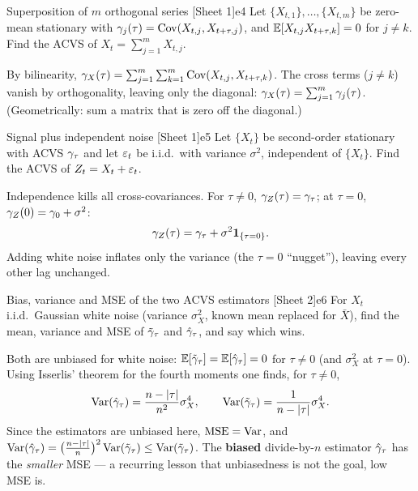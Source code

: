 \begin{exercise}{Superposition of $m$ orthogonal series \quad\textnormal{[Sheet 1]}}{e4}
Let $\{X_{t,1}\},\dots,\{X_{t,m}\}$ be zero-mean stationary with
$\gamma_j(\tau)=\operatorname{Cov}(X_{t,j},X_{t+\tau,j})$, and $\mathbb{E}[X_{t,j}X_{t+\tau,k}]=0$ for
$j\ne k$. Find the ACVS of $X_t=\sum_{j=1}^m X_{t,j}$.
\end{exercise}
\begin{solution}
By bilinearity, $\gamma_X(\tau)=\sum_{j=1}^m\sum_{k=1}^m\operatorname{Cov}(X_{t,j},X_{t+\tau,k})$.
The cross terms ($j\ne k$) vanish by orthogonality, leaving only the diagonal:
$\gamma_X(\tau)=\sum_{j=1}^m\gamma_j(\tau)$. (Geometrically: sum a matrix that is
zero off the diagonal.)
\end{solution}

\begin{exercise}{Signal plus independent noise \quad\textnormal{[Sheet 1]}}{e5}
Let $\{X_t\}$ be second-order stationary with ACVS $\gamma_\tau$ and let
$\varepsilon_t$ be i.i.d.\ with variance $\sigma^2$, independent of $\{X_t\}$. Find the
ACVS of $Z_t=X_t+\varepsilon_t$.
\end{exercise}
\begin{solution}
Independence kills all cross-covariances. For $\tau\ne0$,
$\gamma_Z(\tau)=\gamma_\tau$; at $\tau=0$, $\gamma_Z(0)=\gamma_0+\sigma^2$:
\[
\gamma_Z(\tau)=\gamma_\tau+\sigma^2\mathbf{1}_{\{\tau=0\}} .
\]
Adding white noise inflates only the variance (the $\tau=0$ ``nugget''),
leaving every other lag unchanged.
\end{solution}

\begin{exercise}{Bias, variance and MSE of the two ACVS estimators \quad\textnormal{[Sheet 2]}}{e6}
For $X_t$ i.i.d.\ Gaussian white noise (variance $\sigma_X^2$, known mean
replaced for $\bar X$), find the mean, variance and MSE of $\tilde{\gamma}_\tau$
and $\hat{\gamma}_\tau$, and say which wins.
\end{exercise}
\begin{solution}
Both are unbiased for white noise: $\mathbb{E}[\tilde{\gamma}_\tau]=\mathbb{E}[\hat{\gamma}_\tau]=0$
for $\tau\ne0$ (and $\sigma_X^2$ at $\tau=0$). Using Isserlis' theorem for the
fourth moments one finds, for $\tau\ne0$,
\[
\operatorname{Var}(\hat{\gamma}_\tau)=\frac{n-\left\lvert \tau \right\rvert}{n^2}\sigma_X^4,
\qquad
\operatorname{Var}(\tilde{\gamma}_\tau)=\frac{1}{n-\left\lvert \tau \right\rvert}\sigma_X^4 .
\]
Since the estimators are unbiased here, $\operatorname{MSE}=\operatorname{Var}$, and
$\operatorname{Var}(\hat{\gamma}_\tau)=\big(\tfrac{n-\left\lvert \tau \right\rvert}{n}\big)^2\operatorname{Var}(\tilde{\gamma}_\tau)
\le\operatorname{Var}(\tilde{\gamma}_\tau)$. The \textbf{biased} divide-by-$n$ estimator
$\hat{\gamma}_\tau$ has the \emph{smaller} MSE --- a recurring lesson that
unbiasedness is not the goal, low MSE is.
\end{solution}


